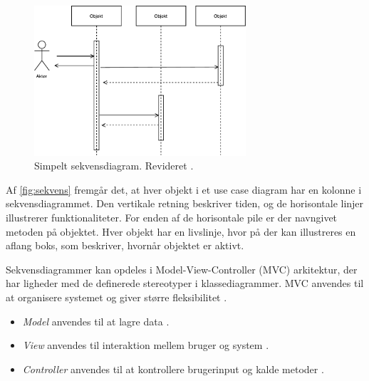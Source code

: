 \begin{figure} [H]
\centering
\includegraphics[width=0.7\textwidth]{figures/sekvens}
\caption{Simpelt sekvensdiagram. Revideret \cite{Brahma2015}.}
\label{fig:sekvens}
\end{figure}

\noindent
Af \autoref{fig:sekvens} fremgår det, at hver objekt i et use case diagram har en kolonne i sekvensdiagrammet. Den vertikale retning beskriver tiden, og de horisontale linjer illustrerer funktionaliteter. For enden af de horisontale pile er der navngivet metoden på objektet. Hver objekt har en livslinje, hvor på der kan illustreres en aflang boks, som beskriver, hvornår objektet er aktivt. \cite{Brahma2015}

Sekvensdiagrammer kan opdeles i Model-View-Controller (MVC) arkitektur, der har ligheder med de definerede stereotyper i klassediagrammer. MVC anvendes til at organisere systemet og giver større fleksibilitet \cite{Brahma2015}. 

\begin{itemize}
\item \textit{Model} anvendes til at lagre data \cite{Brahma2015}.
\item \textit{View} anvendes til interaktion mellem bruger og system \cite{Brahma2015}.
\item \textit{Controller} anvendes til at kontrollere brugerinput og kalde metoder \cite{Brahma2015}.
\end{itemize}